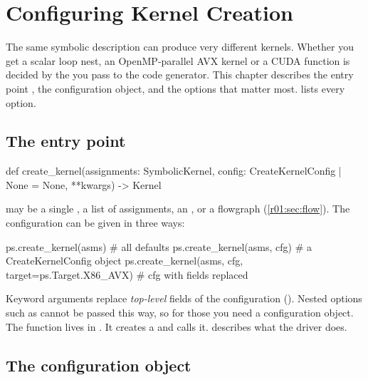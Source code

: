 \chapter{Configuring Kernel Creation}\label{r01:ch:kernel-creation}

The same symbolic description can produce very different kernels. Whether you get a
scalar loop nest, an OpenMP-parallel AVX kernel or a CUDA function is decided by the
 you pass to the code generator. This chapter describes the entry
point , the configuration object, and the options that matter most.
 lists every option.

\section{The entry point}

\begin{pycode}
def create_kernel(assignments: SymbolicKernel,
                  config: CreateKernelConfig | None = None,
                  **kwargs) -> Kernel
\end{pycode}
 may be a single , a list of assignments, an
, or a flowgraph (\cref{r01:sec:flow}). The configuration can be
given in three ways:
\begin{pycode}
ps.create_kernel(asms)                                   # all defaults
ps.create_kernel(asms, cfg)                              # a CreateKernelConfig object
ps.create_kernel(asms, cfg, target=ps.Target.X86_AVX)   # cfg with fields replaced
\end{pycode}
Keyword arguments replace \emph{top-level} fields of the configuration
(). Nested options such as  cannot be
passed this way, so for those you need a configuration object. The function lives in
. It creates a
 and calls it.  describes what
the driver does.

\section{The configuration object}\label{r01:sec:config}

